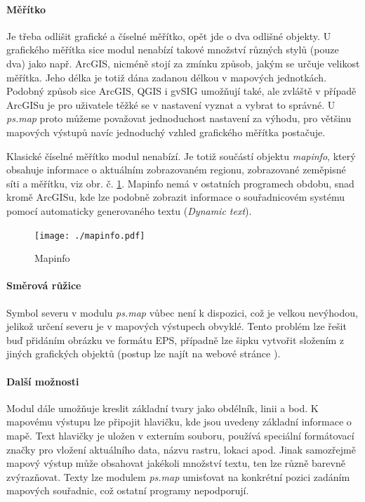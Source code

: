 \documentclass[a4paper,12pt,draft]{article}
\newcommand{\modul}[1]{\emph{#1}}
\begin{document}
\paragraph*{Měřítko}
Je třeba odlišit grafické a číselné měřítko, opět jde o dva
odlišné objekty.
U grafického měřítka sice modul nenabízí takové množství různých
stylů (pouze dva) jako např. ArcGIS, nicméně stojí za zmínku způsob,
jakým se určuje velikost měřítka. Jeho délka je totiž dána zadanou
délkou v mapových jednotkách. Podobný způsob sice ArcGIS, QGIS i gvSIG
umožňují také, ale zvláště v případě ArcGISu je pro uživatele
těžké se v nastavení vyznat a vybrat to správné. U \modul{ps.map} proto
můžeme považovat jednoduchost nastavení za výhodu, pro většinu mapových
výstupů navíc jednoduchý vzhled grafického měřítka postačuje.

Klasické číselné měřítko modul nenabízí. Je totiž součástí
objektu \emph{mapinfo}, který obsahuje informace o aktuálním
zobrazovaném regionu, zobrazované zeměpisné síti a měřítku, viz
obr. č. \ref{fig:mapinfo}. Mapinfo nemá v ostatních programech obdobu,
snad kromě ArcGISu, kde lze podobně zobrazit informace o souřadnicovém
systému pomocí automaticky generovaného textu (\emph{Dynamic text}).
\begin{figure}[h!]
    \centering
    \texttt{[image: ./mapinfo.pdf]}
    \caption{Mapinfo}
    \label{fig:mapinfo}
\end{figure}

\paragraph*{Směrová růžice}
Symbol severu v modulu \modul{ps.map} vůbec není k dispozici, což je velkou
nevýhodou, jelikož určení severu je v mapových výstupech obvyklé. Tento
problém lze řešit buď přidáním obrázku ve formátu EPS, případně
lze šipku vytvořit složením z jiných grafických objektů (postup lze
najít na webové stránce \cite{wiki_psmap_north}).

\paragraph*{Další možnosti}
Modul dále umožňuje kreslit základní tvary jako obdélník, linii a
bod. K mapovému výstupu lze připojit hlavičku, kde jsou uvedeny základní
informace o mapě. Text hlavičky je uložen v externím souboru, používá
speciální formátovací značky pro vložení aktuálního data, názvu
rastru, lokaci apod. Jinak samozřejmě mapový výstup může obsahovat
jakékoli množství textu, ten lze různě barevně zvýrazňovat. Texty lze
modulem \modul{ps.map} umisťovat na konkrétní pozici zadáním mapových
souřadnic, což ostatní programy nepodporují.
\end{document}
